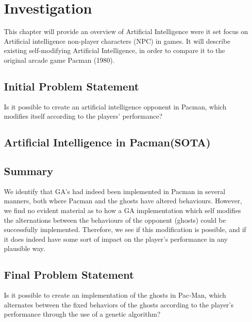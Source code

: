 
\section{Investigation} \label{sec:preanalysus}
This chapter will provide an overview of Artificial Intelligence were it set focus on Artificial intelligence non-player characters (NPC) in games. It will describe existing self-modifying Artificial Intelligence, in order to compare it to the original arcade game Pacman (1980).


\subsection{Initial Problem Statement} \label{sec:initialproblemstatement}
Is it possible to create an artificial intelligence opponent in Pacman, which modifies itself according to the players' performance?



\subsection{Artificial Intelligence in Pacman(SOTA)}



\subsection{Summary}
We identify that GA’s had indeed been implemented in Pacman in several manners, both where Pacman and the ghosts have altered behaviours. However, we find no evident material as to how a GA implementation which self modifies the alternations between the behaviours of the opponent (ghosts) could be successfully implemented. Therefore, we see if this modification is possible, and if it does indeed have some sort of impact on the player’s performance in any plausible way.


\subsection{Final Problem Statement} \label{sec:finalproblemstatement}
Is it possible to create an implementation of the ghosts in Pac-Man, which alternates between the fixed behaviors of the ghosts according to the player's performance through the use of a genetic algorithm?